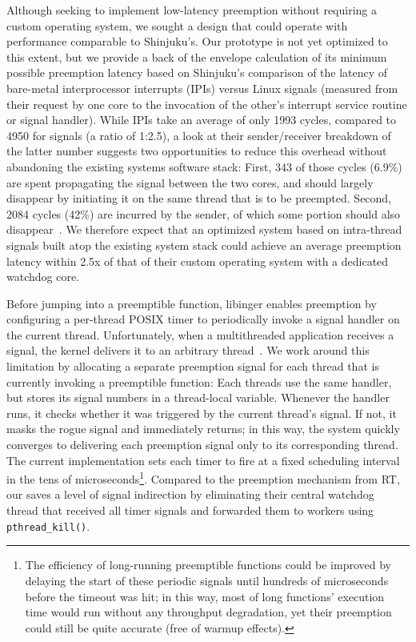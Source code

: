 Although seeking to implement low-latency preemption without requiring a custom
operating system, we sought a design that could operate with performance comparable
to Shinjuku's.  Our prototype is not yet optimized to this extent, but
we provide a back of the envelope calculation of its minimum possible preemption
latency based on Shinjuku's
comparison of the latency of bare-metal interprocessor interrupts (IPIs)
versus Linux signals (measured from their request by one core to the
invocation of the other's interrupt service routine or signal handler).  While
IPIs take an average of only 1993 cycles, compared to 4950 for
signals (a ratio of 1:2.5), a look at their sender/receiver breakdown of the latter
number suggests two opportunities to reduce this overhead without
abandoning the existing systems software stack:  First, 343 of those cycles (6.9\%)
are spent propagating the signal between the two cores, and should largely disappear
by initiating it on the same thread that is to be preempted.  Second, 2084 cycles
(42\%) are incurred by the sender, of which some portion should also
disappear~\cite{Kaffes:nsdi2019}.  We therefore expect that an optimized system based
on intra-thread signals built atop the existing system stack could achieve an
average preemption latency within 2.5x of that of their custom operating
system with a dedicated watchdog core.

Before jumping into a preemptible function, libinger enables preemption by
configuring a per-thread POSIX timer to periodically invoke a signal handler on the
current thread.  Unfortunately, when a multithreaded application receives a signal,
the kernel delivers it to an arbitrary thread~\cite{signal-manpage}.  We work around
this limitation by allocating a separate preemption signal for each thread that is
currently invoking a preemptible function:  Each threads use the same handler, but
stores its signal numbers in a thread-local variable.  Whenever the handler runs, it
checks whether it was triggered by the current thread's signal.  If not, it masks the
rogue signal and immediately returns; in this way, the system quickly converges to
delivering each preemption signal only to its corresponding thread.  The current
implementation sets each timer to fire at a fixed scheduling interval in the tens of
microseconds\footnote{The efficiency of long-running preemptible functions could be
improved by delaying the start of these periodic signals until
hundreds of microseconds before the timeout was hit; in this way, most of long
functions' execution time would run without any throughput degradation, yet their
preemption could still be quite accurate (free of warmup effects).}.  Compared to the
preemption mechanism from RT, our saves a level of signal indirection by eliminating
their central watchdog thread that received all timer signals and forwarded them to
workers using \texttt{pthread\_kill()}.

